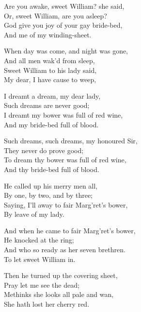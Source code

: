 \begin{dcverse}\begin{altverse}
Are you awake, sweet William? she said,\\
Or, sweet William, are you asleep?\\
God give you joy of your gay bride-bed,\\
And me of my winding-sheet.
\end{altverse}

\begin{altverse}
When day was come, and night was gone,\\
And all men wak’d from sleep,\\
Sweet William to his lady said,\\
My dear, I have cause to weep,
\end{altverse}

\begin{altverse}
I dreamt a dream, my dear lady,\\
Such dreams are never good;\\
I dreamt my bower was full of red wine,\\
And my bride-bed full of blood.
\end{altverse}

\begin{altverse}
Such dreams, such dreams, my honoured Sir,\\
They never do prove good;\\
To dream thy bower was full of red wine,\\
And thy bride-bed full of blood.
\end{altverse}

\begin{altverse}
He called up his merry men all,\\
By one, by two, and by three;\\
Saying, I’ll away to fair Marg’ret’s bower,\\
By leave of my lady.
\end{altverse}

\begin{altverse}
And when he came to fair Marg’ret’s bower,\\
He knocked at the ring;\\
And who so ready as her seven brethren.\\
To let sweet William in.
\end{altverse}

\begin{altverse}
Then he turned up the covering sheet,\\
Pray let me see the dead;\\
Methinks she looks all pale and wan,\\
She hath lost her cherry red.
\end{altverse}


\end{dcverse}
